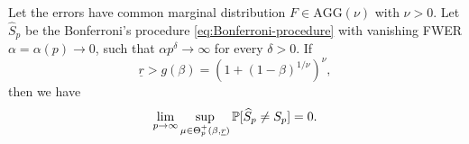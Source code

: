 \begin{theorem} \label{thm:sufficient}
Let the errors have common marginal distribution $F\in \text{AGG}(\nu)$ with $\nu>0$.
Let $\widehat{S}_p$ be the Bonferroni's procedure \eqref{eq:Bonferroni-procedure} with vanishing FWER $\alpha = \alpha(p) \to 0$, such that %
$\alpha p^\delta\to \infty$ for every $\delta>0$.
If
\begin{equation} \label{eq:signal-above-boundary}
    \underline{r} > g(\beta) = (1 + (1 - \beta)^{1/\nu})^\nu,
\end{equation}
then we have
\begin{equation} \label{eq:exact-supporot-recovery}
    \lim_{p\to\infty}\sup_{\mu\in\Theta_p^+(\beta, \underline{r})} \P[\widehat{S}_p \neq S_p] = 0.
\end{equation}
\end{theorem}
